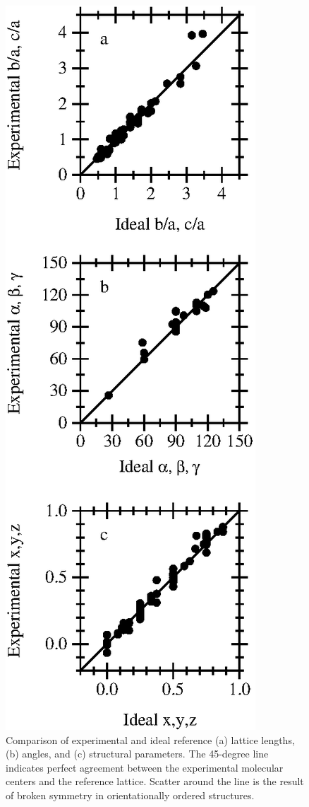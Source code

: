 \documentclass[preprint]{iucr}              %
\begin{document}
\begin{figure}
\begin{center}
\includegraphics{compare2EPS.eps}
\end{center}
\caption[Comparison of experimental and ideal reference
structures.]{Comparison of experimental and ideal reference (a)
lattice lengths, (b) angles, and (c) structural parameters. The
45-degree line indicates perfect agreement between the experimental
molecular centers and the reference lattice. Scatter around the line
is the result of broken symmetry in orientationally ordered
structures.} \label{comparison}
\end{figure}
\end{document}
